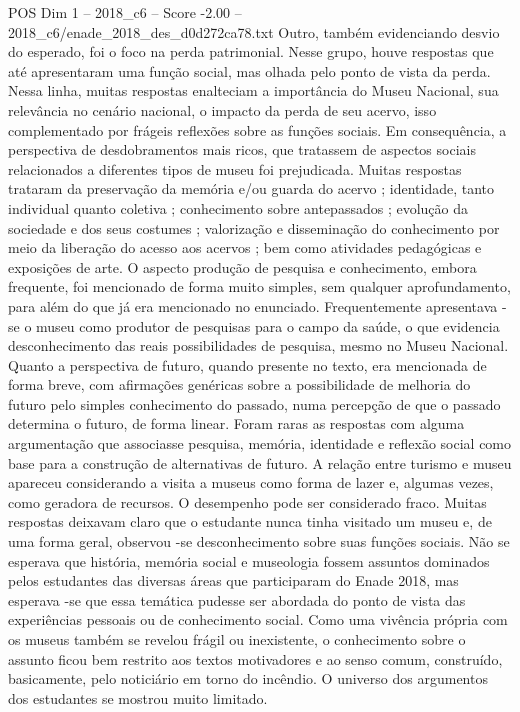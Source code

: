 \begin{textsample}{POS Dim 1 – 2018\_c6 – Score -2.00 – 2018\_c6/enade\_2018\_des\_d0d272ca78.txt}
Outro, também evidenciando desvio do esperado, foi o foco na perda patrimonial.
Nesse grupo, houve respostas que até apresentaram uma função social, mas olhada pelo ponto de vista da perda.
Nessa linha, muitas respostas enalteciam a importância do Museu Nacional, sua relevância no cenário nacional, o impacto da perda de seu acervo, isso complementado por frágeis reflexões sobre as funções sociais.
Em consequência, a perspectiva de desdobramentos mais ricos, que tratassem de aspectos sociais relacionados a diferentes tipos de museu foi prejudicada.
Muitas respostas trataram da preservação da memória e/ou guarda do acervo ; identidade, tanto individual quanto coletiva ; conhecimento sobre antepassados ; evolução da sociedade e dos seus costumes ; valorização e disseminação do conhecimento por meio da liberação do acesso aos acervos ; bem como atividades pedagógicas e exposições de arte.
O aspecto produção de pesquisa e conhecimento, embora frequente, foi mencionado de forma muito simples, sem qualquer aprofundamento, para além do que já era mencionado no enunciado.
Frequentemente apresentava -se o museu como produtor de pesquisas para o campo da saúde, o que evidencia desconhecimento das reais possibilidades de pesquisa, mesmo no Museu Nacional.
Quanto a perspectiva de futuro, quando presente no texto, era mencionada de forma breve, com afirmações genéricas sobre a possibilidade de melhoria do futuro pelo simples conhecimento do passado, numa percepção de que o passado determina o futuro, de forma linear.
Foram raras as respostas com alguma argumentação que associasse pesquisa, memória, identidade e reflexão social como base para a construção de alternativas de futuro.
A relação entre turismo e museu apareceu considerando a visita a museus como forma de lazer e, algumas vezes, como geradora de recursos.
O desempenho pode ser considerado fraco.
Muitas respostas deixavam claro que o estudante nunca tinha visitado um museu e, de uma forma geral, observou -se desconhecimento sobre suas funções sociais.
Não se esperava que história, memória social e museologia fossem assuntos dominados pelos estudantes das diversas áreas que participaram do Enade 2018, mas esperava -se que essa temática pudesse ser abordada do ponto de vista das experiências pessoais ou de conhecimento social.
Como uma vivência própria com os museus também se revelou frágil ou inexistente, o conhecimento sobre o assunto ficou bem restrito aos textos motivadores e ao senso comum, construído, basicamente, pelo noticiário em torno do incêndio.
O universo dos argumentos dos estudantes se mostrou muito limitado.

\end{textsample}
